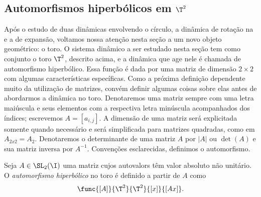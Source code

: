 \begin{comment}
Vamos agora mostrar que vale a relação comutativa $\phi \circ f = \sigma \circ \phi$. Seja $x \in F$ e $\phi(x) = (x_n)_{n \in \I}$. Nesse caso, sabemos que $x \in R_{(x_n)_{n \in \I}}$. Aplicando $f$ a $R_{(x_n)}$, temos
	\begin{align*}
	f(R_{(x_n)_{n \in \I}}) &= f\left( \bigcap_{i \in \I}f^i(R_{x_i})\right) \\
				&= \bigcap_{i \in \I}f^{i+1}(R_{x_i}) \\
				&= \bigcap_{i \in \I}f^i(R_{x_{i-1}}) \\
				&= R_{(x_{n-1})_{n \in \I}}.
	\end{align*}
Mas isso implica que $f(x) \in R_{(x_{n-1})_{n \in \I}}$ e, portanto, pela bijetividade de $\phi$, temos $\phi(f(x)) = (x_{n-1})_{n \in \I}$. Por outro lado, como $\phi(x) = (x_n)_{n \in \I}$, temos $\sigma(\phi(x)) = (x_{n-1})_{n \in \I}$. Logo $\phi \circ f = \sigma \circ \phi$.
\end{proof}

\end{comment}

\subsection{Automorfismos hiperbólicos em \ensuremath{\T^2}}

Após o estudo de duas dinâmicas envolvendo o círculo, a dinâmica de rotação na  e a de expansão, voltamos nossa atenção nesta seção a um novo objeto geométrico: o toro. O sistema dinâmico a ser estudado nesta seção tem como conjunto o toro $\T^2$, descrito acima, e a dinâmica que age nele é chamada de automorfismo hiperbólico. Essa função é dada por uma matriz de dimensão $2 \times 2$ com algumas características específicas. Como a próxima definição dependente muito da utilização de matrizes, convém definir algumas coisas sobre elas antes de abordarmos a dinâmica no toro. Denotaremos uma matriz sempre com uma letra maiúscula e seus elementos com a respectiva letra minúscula acompanhados dos índices; escrevemos $A = [a_{i,j}]$. A dimensão de uma matriz será explicitada somente quando necessário e será simplificada para matrizes quadradas, como em $A_{2x2}=A_{2}$. Denotaremos o determinante de uma matriz $A$ por $|A|$ ou $\det(A)$ e sua matriz inversa por $A^{-1}$. Convenções esclarecidas, definimos o automorfismo.

\begin{definition}
Seja $A \in \SL_2(\I)$ uma matriz cujos autovalors têm valor absoluto não unitário. O \textit{automorfismo hiperbólico} no toro é definido a partir de $A$ como
	\begin{align*}
	\func{[A]}{\T^2}{\T^2}{[x]}{[Ax]}.
	\end{align*}
\end{definition}

